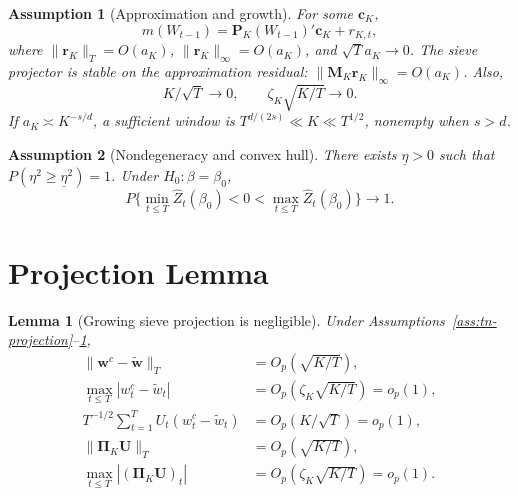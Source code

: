 \documentclass[11pt]{article}
\newtheorem{lemma}{Lemma}
\newtheorem{assumption}{Assumption}
\begin{document}
\begin{assumption}[Approximation and growth]
\label{ass:tn-approx}
For some \(\bm c_K\),
\[
    m(W_{t-1})=\bm P_K(W_{t-1})'\bm c_K+r_{K,t},
\]
where \(\|\bm r_K\|_T=O(a_K)\), \(\|\bm r_K\|_\infty=O(a_K)\), and \(\sqrt Ta_K\to0\). The sieve projector is stable on the approximation residual: \(\|\bm M_K\bm r_K\|_\infty=O(a_K)\). Also,
\[
    K/\sqrt T\to0,
    \qquad
    \zeta_K\sqrt{K/T}\to0.
\]
If \(a_K\asymp K^{-s/d}\), a sufficient window is \(T^{d/(2s)}\ll K\ll T^{1/2}\), nonempty when \(s>d\).
\end{assumption}

\begin{assumption}[Nondegeneracy and convex hull]
\label{ass:tn-hull}
There exists \(\underline\eta>0\) such that \(P(\eta^2\geq\underline\eta^2)=1\). Under \(H_0:\beta=\beta_0\),
\[
    P\{\min_{t\leq T}\widehat Z_t(\beta_0)<0<\max_{t\leq T}\widehat Z_t(\beta_0)\}\to1.
\]
\end{assumption}

\section{Projection Lemma}

\begin{lemma}[Growing sieve projection is negligible]
\label{lem:tn-projection}
Under Assumptions~\ref{ass:tn-projection}--\ref{ass:tn-approx},
\begin{align}
    \|\bm w^c-\widetilde{\bm w}\|_T&=O_p(\sqrt{K/T}),
      \label{eq:tn-weight-l2}\\
    \max_{t\leq T}|w_t^c-\widetilde w_t|&=O_p(\zeta_K\sqrt{K/T})=o_p(1),
      \label{eq:tn-weight-max}\\
    T^{-1/2}\sum_{t=1}^TU_t(w_t^c-\widetilde w_t)&=O_p(K/\sqrt T)=o_p(1),
      \label{eq:tn-weight-score}\\
    \|\bm\Pi_K\bm U\|_T&=O_p(\sqrt{K/T}),
      \label{eq:tn-u-l2}\\
    \max_{t\leq T}|(\bm\Pi_K\bm U)_t|&=O_p(\zeta_K\sqrt{K/T})=o_p(1).
      \label{eq:tn-u-max}
\end{align}
\end{lemma}
\end{document}
